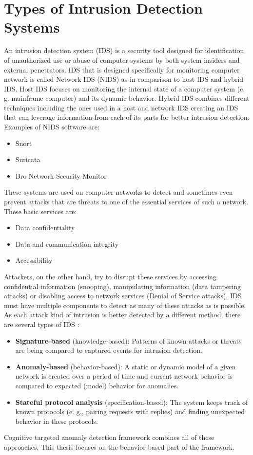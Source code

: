 \documentclass[thesis=B,english]{FITthesis}[2012/10/20]
\begin{document}
\section{Types of Intrusion Detection Systems}

An intrusion detection system (IDS) is a security tool designed for identification of unauthorized use or abuse of computer systems by both system insiders and external penetrators\cite{mukherjee1994network}.
IDS that is designed specifically for monitoring computer network is called Network IDS (NIDS) as in comparison to host IDS and hybrid IDS.
Host IDS focuses on monitoring the internal state of a computer system (e. g. mainframe computer) and its dynamic behavior.
Hybrid IDS combines different techniques including the ones used in a host and network IDS creating an IDS that can leverage information from each of its parts for better intrusion detection.
Examples of NIDS software are:
\begin{itemize}
    \item Snort
    \item Suricata
    \item Bro Network Security Monitor
\end{itemize}
These systems are used on computer networks to detect and sometimes even prevent attacks that are threats to one of the essential services of such a network.
These basic services are\cite{mukherjee1994network:1}:
\begin{itemize}
    \item Data confidentiality
    \item Data and communication integrity
    \item Accessibility
\end{itemize}
Attackers, on the other hand, try to disrupt these services by accessing confidential information (snooping), manipulating information (data tampering attacks) or disabling access to network services (Denial of Service attacks).
IDS must have multiple components to detect as many of these attacks as is possible.
As each attack kind of intrusion is better detected by a different method, there are several types of IDS \cite{liao2013intrusion}:
\begin{itemize}
    \item \textbf{Signature-based} (knowledge-based): Patterns of known attacks or threats are being compared to captured events for intrusion detection.
    \item \textbf{Anomaly-based} (behavior-based): A static or dynamic model of a given network is created over a period of time and current network behavior is compared to expected (model) behavior for anomalies.
    \item \textbf{Stateful protocol analysis} (specification-based): The system keeps track of known protocols (e. g., pairing requests with replies) and finding unexpected behavior in these protocols.
\end{itemize}
Cognitive targeted anomaly detection framework combines all of these approaches.
This thesis focuses on the behavior-based part of the framework.
\end{document}
